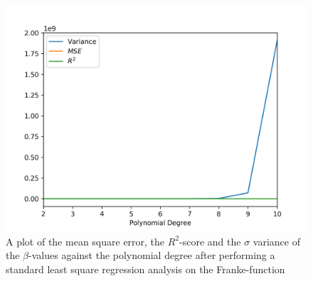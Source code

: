 \documentclass[a4paper,10pt,english]{article}
\begin{document}
\begin{figure}[H]
	\centering 
	\includegraphics[scale=0.9]{HiResData/franke_output/part_A.png}
	\caption{
		A plot of the mean square error, the $R^2$-score and the $\sigma$ variance of the $\beta$-values against the polynomial degree after performing a standard least square regression analysis on the Franke-function
	}
	\label{part_a}
\end{figure}
\end{document}
